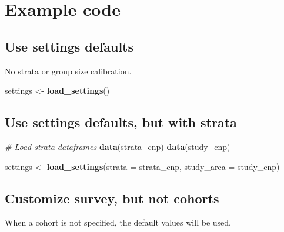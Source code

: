 \documentclass[
]{book}
\newenvironment{Shaded}{\begin{snugshade}}{\end{snugshade}}
\newcommand{\CommentTok}[1]{\textcolor[rgb]{0.56,0.35,0.01}{\textit{#1}}}
\newcommand{\DataTypeTok}[1]{\textcolor[rgb]{0.13,0.29,0.53}{#1}}
\newcommand{\KeywordTok}[1]{\textcolor[rgb]{0.13,0.29,0.53}{\textbf{#1}}}
\newcommand{\NormalTok}[1]{#1}
\newcommand{\StringTok}[1]{\textcolor[rgb]{0.31,0.60,0.02}{#1}}
\begin{document}
\hypertarget{example-code}{%
\section*{Example code}\label{example-code}}

\hypertarget{use-settings-defaults}{%
\subsection*{Use settings defaults}\label{use-settings-defaults}}

No strata or group size calibration.

\begin{Shaded}
\begin{Highlighting}[]
\NormalTok{settings <-}\StringTok{ }\KeywordTok{load_settings}\NormalTok{()}
\end{Highlighting}
\end{Shaded}

\hypertarget{use-settings-defaults-but-with-strata}{%
\subsection*{Use settings defaults, but with strata}\label{use-settings-defaults-but-with-strata}}

\begin{Shaded}
\begin{Highlighting}[]
\CommentTok{# Load strata dataframes}
\KeywordTok{data}\NormalTok{(strata_cnp)}
\KeywordTok{data}\NormalTok{(study_cnp)}

\NormalTok{settings <-}\StringTok{ }\KeywordTok{load_settings}\NormalTok{(}\DataTypeTok{strata =}\NormalTok{ strata_cnp,}
                          \DataTypeTok{study_area =}\NormalTok{ study_cnp)}
\end{Highlighting}
\end{Shaded}

\hypertarget{customize-survey-but-not-cohorts}{%
\subsection*{Customize survey, but not cohorts}\label{customize-survey-but-not-cohorts}}

When a cohort is not specified, the default values will be used.
\end{document}
